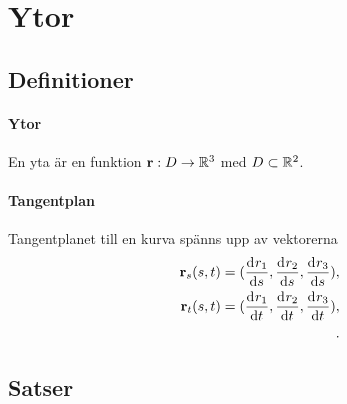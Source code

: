 \section{Ytor}

\subsection{Definitioner}

\paragraph{Ytor}
En yta är en funktion $\vect{r}: D\to\R^3$ med $D\subset\mathbb{R}^2$.

\paragraph{Tangentplan}
Tangentplanet till en kurva spänns upp av vektorerna
\begin{align*}
	\vect{r}_s(s, t) = (\deval{r_1}{s}{s, t}, \deval{r_2}{s}{s, t}, \deval{r_3}{s}{s, t}), \\
	\vect{r}_t(s, t) = (\deval{r_1}{t}{s, t}, \deval{r_2}{t}{s, t}, \deval{r_3}{t}{s, t}), \\.
\end{align*}

\subsection{Satser}